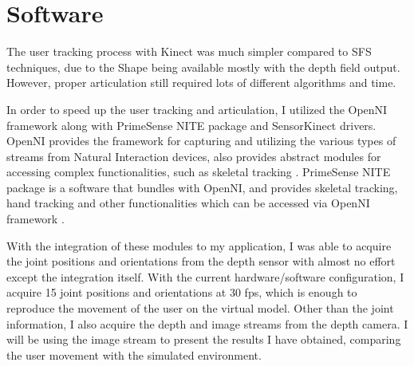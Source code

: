 \section{Software}

The user tracking process with Kinect was much simpler compared to SFS techniques, due to the Shape being available mostly with the depth field output. However, proper articulation still required lots of different algorithms and time.

In order to speed up the user tracking and articulation, I utilized the OpenNI framework along with PrimeSense NITE package and SensorKinect drivers. OpenNI provides the framework for capturing and utilizing the various types of streams from Natural Interaction devices, also provides abstract modules for accessing complex functionalities, such as skeletal tracking \cite{OpenNI2102}. PrimeSense NITE package is a software that bundles with OpenNI, and provides skeletal tracking, hand tracking and other functionalities which can be accessed via OpenNI framework \cite{PS2102}. 

With the integration of these modules to my application, I was able to acquire the joint positions and orientations from the depth sensor with almost no effort except the integration itself. With the current hardware/software configuration, I acquire 15 joint positions and orientations at 30 fps, which is enough to reproduce the movement of the user on the virtual model. Other than the joint information, I also acquire the depth and image streams from the depth camera. I will be using the image stream to present the results I have obtained, comparing the user movement with the simulated environment.
